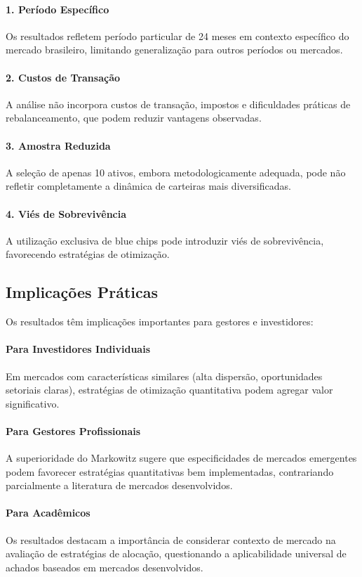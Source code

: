 \paragraph{1. Período Específico}
Os resultados refletem período particular de 24 meses em contexto específico do mercado brasileiro, limitando generalização para outros períodos ou mercados.

\paragraph{2. Custos de Transação}
A análise não incorpora custos de transação, impostos e dificuldades práticas de rebalanceamento, que podem reduzir vantagens observadas.

\paragraph{3. Amostra Reduzida}
A seleção de apenas 10 ativos, embora metodologicamente adequada, pode não refletir completamente a dinâmica de carteiras mais diversificadas.

\paragraph{4. Viés de Sobrevivência}
A utilização exclusiva de blue chips pode introduzir viés de sobrevivência, favorecendo estratégias de otimização.

\subsection{Implicações Práticas}

Os resultados têm implicações importantes para gestores e investidores:

\paragraph{Para Investidores Individuais}
Em mercados com características similares (alta dispersão, oportunidades setoriais claras), estratégias de otimização quantitativa podem agregar valor significativo.

\paragraph{Para Gestores Profissionais}
A superioridade do Markowitz sugere que especificidades de mercados emergentes podem favorecer estratégias quantitativas bem implementadas, contrariando parcialmente a literatura de mercados desenvolvidos.

\paragraph{Para Acadêmicos}
Os resultados destacam a importância de considerar contexto de mercado na avaliação de estratégias de alocação, questionando a aplicabilidade universal de achados baseados em mercados desenvolvidos.